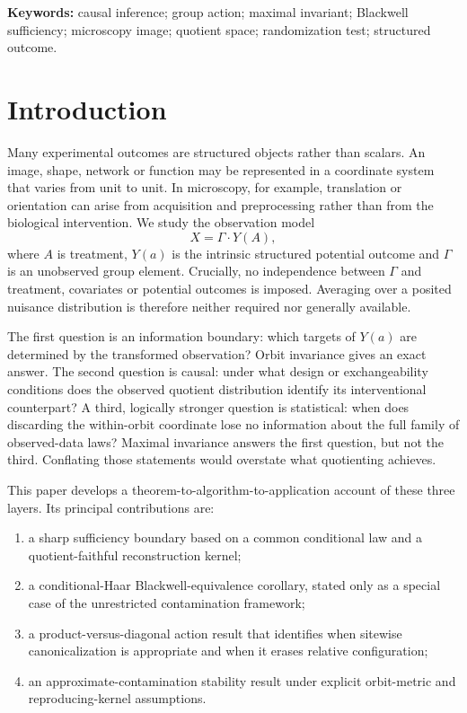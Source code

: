 \documentclass[11pt]{article}
\theoremstyle{plain}
\theoremstyle{definition}
\numberwithin{equation}{section}
\newcommand{\1}{\mathbf 1}
\begin{document}
\noindent\textbf{Keywords:} causal inference; group action; maximal invariant; Blackwell sufficiency; microscopy image; quotient space; randomization test; structured outcome.

\section{Introduction}\label{sec:introduction}

Many experimental outcomes are structured objects rather than scalars. An image, shape, network or function may be represented in a coordinate system that varies from unit to unit. In microscopy, for example, translation or orientation can arise from acquisition and preprocessing rather than from the biological intervention. We study the observation model
\begin{equation}\label{eq:observation}
X=\Gamma\cdot Y(A),
\end{equation}
where $A$ is treatment, $Y(a)$ is the intrinsic structured potential outcome and $\Gamma$ is an unobserved group element. Crucially, no independence between $\Gamma$ and treatment, covariates or potential outcomes is imposed. Averaging over a posited nuisance distribution is therefore neither required nor generally available.

The first question is an information boundary: which targets of $Y(a)$ are determined by the transformed observation? Orbit invariance gives an exact answer. The second question is causal: under what design or exchangeability conditions does the observed quotient distribution identify its interventional counterpart? A third, logically stronger question is statistical: when does discarding the within-orbit coordinate lose no information about the full family of observed-data laws? Maximal invariance answers the first question, but not the third. Conflating those statements would overstate what quotienting achieves.

This paper develops a theorem-to-algorithm-to-application account of these three layers. Its principal contributions are:
\begin{enumerate}
\item a sharp sufficiency boundary based on a common conditional law and a quotient-faithful reconstruction kernel;
\item a conditional-Haar Blackwell-equivalence corollary, stated only as a special case of the unrestricted contamination framework;
\item a product-versus-diagonal action result that identifies when sitewise canonicalization is appropriate and when it erases relative configuration;
\item an approximate-contamination stability result under explicit orbit-metric and reproducing-kernel assumptions.
\end{enumerate}
\end{document}
